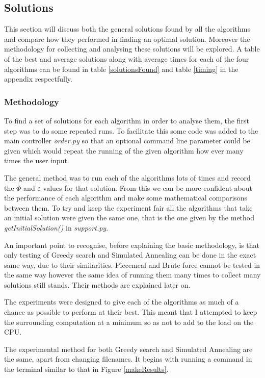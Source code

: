 \documentclass[12pt]{report}
\begin{document}
\subsection{Solutions}\label{solutions}
This section will discuss both the general solutions found by all the algorithms and compare how they performed in finding an optimal solution. Moreover the methodology for collecting and analysing these solutions will be explored. A table of the best and average solutions along with average times for each of the four algorithms can be found in table \ref{solutionsFound} and table \ref{timing} in the appendix respectfully. 

\subsubsection{Methodology}
To find a set of solutions for each algorithm in order to analyse them, the first step was to do some repeated runs. To facilitate this some code was added to the main controller \textit{order.py} so that an optional command line parameter could be given which would repeat the running of the given algorithm how ever many times the user input. 

The general method was to run each of the algorithms lots of times and record the $\Phi$ and $\varepsilon$ values for that solution. From this we can be more confident about the performance of each algorithm and make some mathematical comparisons between them. To try and keep the experiment fair all the algorithms that take an initial solution were given the same one, that is the one given by the method \textit{getInitialSolution()} in \textit{support.py}.

An important point to recognise, before explaining the basic methodology, is that only testing of Greedy search and Simulated Annealing can be done in the exact same way, due to their similarities. Piecemeal and Brute force cannot be tested in the same way however the same idea of running them many times to collect many solutions still stands. Their methods are explained later on.

The experiments were designed to give each of the algorithms as much of a chance as possible to perform at their best. This meant that I attempted to keep the surrounding computation at a minimum so as not to add to the load on the CPU.

The experimental method for both Greedy search and Simulated Annealing are the same, apart from changing filenames. It begins with running a command in the terminal similar to that in Figure \ref{makeResults}.
\end{document}
